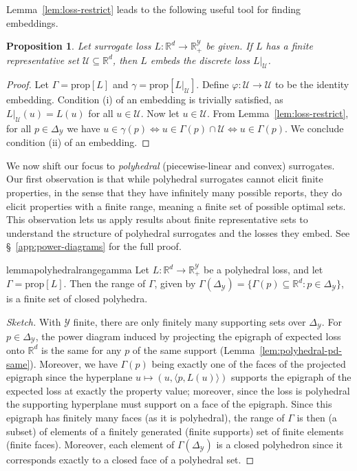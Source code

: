 \documentclass[11pt]{article}
\newcommand{\reals}{\mathbb{R}}
\newcommand{\prop}[1]{\mathrm{prop}[#1]}
\newcommand{\simplex}{\Delta_\Y}
\newcommand{\U}{\mathcal{U}}
\newcommand{\Y}{\mathcal{Y}}
\newcommand{\inprod}[2]{\langle #1, #2 \rangle}%
\newtheorem{proposition}{Proposition}
\begin{document}
Lemma~\ref{lem:loss-restrict} leads to the following useful tool for finding embeddings.
\begin{proposition}\label{prop:representative-embeds-restriction}
  Let surrogate loss $L:\reals^d \to \reals^\Y_+$ be given.
  If $L$ has a finite representative set $\U \subseteq \reals^d$, then $L$ embeds the discrete loss $L|_\U$.
\end{proposition}
\begin{proof}
  Let $\Gamma = \prop{L}$ and $\gamma = \prop{L|_\U}$.
  Define $\varphi : \U \to \U$ to be the identity embedding.
  Condition (i) of an embedding is trivially satisfied, as $L|_\U(u) = L(u)$ for all $u\in\U$.
  Now let $u\in\U$.
  From Lemma~\ref{lem:loss-restrict}, for all $p\in\simplex$ we have $u \in \gamma(p) \iff u \in \Gamma(p) \cap \U \iff u \in \Gamma(p)$.
  We conclude condition (ii) of an embedding.
\end{proof}


We now shift our focus to \emph{polyhedral} (piecewise-linear and convex) surrogates.
Our first observation is that while polyhedral surrogates cannot elicit finite properties, in the sense that they have infinitely many possible reports, they do elicit properties with a finite range, meaning a finite set of possible optimal sets.
This observation lets us apply results about finite representative sets to understand the structure of polyhedral surrogates and the losses they embed.
See \S~\ref{app:power-diagrams} for the full proof.

\begin{restatable}{lemma}{polyhedralrangegamma}
	\label{lem:polyhedral-range-gamma}
	Let $L:\reals^d\to\reals_+^\Y$ be a polyhedral loss, and let $\Gamma = \prop{L}$.
	Then the range of $\Gamma$, given by $\Gamma(\simplex) = \{\Gamma(p) \subseteq \reals^d : p\in\simplex\}$, is a finite set of closed polyhedra.
\end{restatable}
\begin{proof}[Sketch]
	With $\Y$ finite, there are only finitely many supporting sets over $\simplex$.
	For $p \in \simplex$, the power diagram induced by projecting the epigraph of expected loss onto $\reals^d$ is the same for any $p$ of the same support (Lemma~\ref{lem:polyhedral-pd-same}).
	Moreover, we have $\Gamma(p)$ being exactly one of the faces of the projected epigraph since the hyperplane $u \mapsto (u, \inprod{p}{L(u)})$ supports the epigraph of the expected loss at exactly the property value; moreover, since the loss is polyhedral the supporting hyperplane must support on a face of the epigraph.
	Since this epigraph has finitely many faces (as it is polyhedral), the range of $\Gamma$ is then (a subset) of elements of a finitely generated (finite supports) set of finite elements (finite faces).
	Moreover, each element of $\Gamma(\simplex)$ is a closed polyhedron since it corresponds exactly to a closed face of a polyhedral set.
\end{proof}
\end{document}
